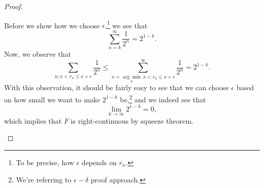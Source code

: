 \begin{proof}
\begin{itemize}
		      \par Before we show how we choose \(\epsilon \),\footnote{To be precise, how \(\epsilon \) depends on \(r_n\).} we see that
		      \[
			      \sum\limits_{n=k}^{\infty }\frac{1}{2^n} = 2^{1-k}.
		      \]
		      Now, we observe that
		      \[
			      \sum\limits_{n;x< r_{n}\leq x+\epsilon }\frac{1}{2^n}\leq \sum\limits_{n=\underset{k}{\arg\mathop{\min}}\ x< r_{k}\leq x+\epsilon }^{\infty }\frac{1}{2^n} = 2^{1-k}.
		      \]
		      With this observation, it should be fairly easy to see that we can choose \(\epsilon \) based on how small we want to make \(2^{1-k}\) be,\footnote{We're referring to \(\epsilon -\delta \) proof approach.}
		      and we indeed see that
		      \[
			      \lim\limits_{k \to \infty} 2^{1-k} = 0,
		      \]
		      which implies that \(F\) is right-continuous by squeeze theorem.
	\end{itemize}
\end{proof}

